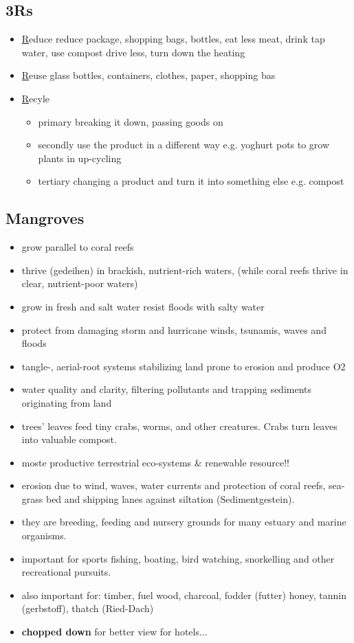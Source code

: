 \documentclass[a5paper,12pt,twoside,titlepage]{scrartcl}
\begin{document}
\subsection{3Rs} 
\begin{itemize}
	\item \underline{R}educe
	\subitem reduce package, shopping bags, bottles, 
	\subitem eat less meat, drink tap water, use compost
	\subitem drive less, turn down the heating
	\item \underline{R}euse
	\subitem glass bottles, containers, clothes, paper, shopping bas
	\item \underline{R}ecyle
	\begin{itemize}
		\item primary
		\subitem breaking it down, passing goods on
		\item secondly
		\subitem use the product in a different way
		\subitem e.g. yoghurt pots to grow plants in 
		\subitem \textrightarrow up-cycling
		\item tertiary
		\subitem changing a product and 
		\subitem turn it into something else
		\subitem e.g. compost
	\end{itemize}
\end{itemize}	
\subsection{Mangroves}
			\begin{itemize}
			\item grow parallel to coral reefs
			\item thrive (gedeihen) in brackish, nutrient-rich waters, (while coral reefs thrive in clear, nutrient-poor waters)
			\item grow in fresh and salt water \textrightarrow resist floods with salty water 
			\item protect from damaging storm and hurricane winds, tsunamis, waves and floods
			\item  tangle-,  aerial-root systems stabilizing land prone to erosion and produce O2
			\item water quality and clarity, filtering pollutants and trapping sediments originating from land
			\item trees' leaves feed tiny crabs, worms, and other creatures. Crabs turn leaves into valuable compost.
			\item moste productive terrestrial eco-systems \& renewable resource!!
			\item erosion due to wind, waves, water currents and protection of coral reefs, sea-grass bed and shipping lanes against siltation (Sedimentgestein).
			\item they are breeding, feeding and nursery grounds for many estuary and marine organisms.
			\item important for sports fishing, boating, bird watching, snorkelling and other recreational pursuits.
			\item also important for: timber, fuel wood, charcoal, fodder (futter) honey, tannin (gerbstoff), thatch (Ried-Dach)
			\item \textbf{chopped down} for better view for hotels...
			\end{itemize}	
\end{document}
